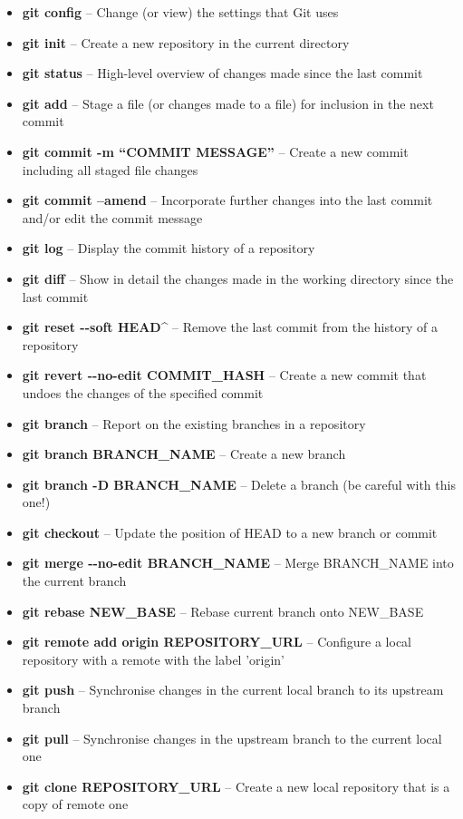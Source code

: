 \documentclass[9pt]{extarticle}
\def\itempad{-1pt}
\begin{document}
\begin{bluebox}[title=Git Command Cheat Sheet]
  \begin{itemize}
    \itemsep\itempad
  \item \textbf{git config} -- Change (or view) the settings that Git uses
  \item \textbf{git init} -- Create a new repository in the current directory
  \item \textbf{git status} -- High-level overview of changes made since the last commit
  \item \textbf{git add} -- Stage a file (or changes made to a file) for inclusion in
    the next commit
  \item \textbf{git commit -m ``COMMIT MESSAGE''} -- Create a new commit including all
    staged file changes
  \item \textbf{git commit --amend} -- Incorporate further changes into the last commit
    and/or edit the commit message
  \item \textbf{git log} -- Display the commit history of a repository
  \item \textbf{git diff} -- Show in detail the changes made in the working directory
    since the last commit
  \item \textbf{git reset -{}-soft HEAD\^} -- Remove the last commit from the history of
    a repository
  \item \textbf{git revert -{}-no-edit COMMIT\_HASH} -- Create a new commit that undoes
    the changes of the specified commit
  \item \textbf{git branch} -- Report on the existing branches in a repository
  \item \textbf{git branch BRANCH\_NAME} -- Create a new branch
  \item \textbf{git branch -D BRANCH\_NAME} -- Delete a branch (be careful with this one!)
  \item \textbf{git checkout} -- Update the position of HEAD to a new branch or commit
  \item \textbf{git merge -{}-no-edit BRANCH\_NAME} -- Merge BRANCH\_NAME into the
    current branch
  \item \textbf{git rebase NEW\_BASE} -- Rebase current branch onto NEW\_BASE
  \item \textbf{git remote add origin REPOSITORY\_URL} -- Configure a local repository
    with a remote with the label 'origin'
  \item \textbf{git push} -- Synchronise changes in the current local branch to its
    upstream branch
  \item \textbf{git pull} -- Synchronise changes in the upstream branch to the current
    local one
  \item \textbf{git clone REPOSITORY\_URL} -- Create a new local repository that is a
    copy of remote one
  \end{itemize}
\end{bluebox}
\end{document}

